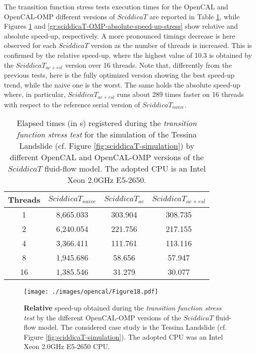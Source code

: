 The transition function stress tests execution times for the
OpenCAL and OpenCAL-OMP different versions of $SciddicaT$ are
reported in Table \ref{tab:sciddicaT-OMP-execution-times-stress},
while Figures \ref{gr:sciddicaT-OMP-relative-speed-up-stress} and
\ref{gr:sciddicaT-OMP-absolute-speed-up-stress} show relative and
absolute speed-up, respectively. A more pronounced timings
decrease is here observed for each $SciddicaT$ version as the
number of threads is increased. This is confirmed by the relative
speed-up, where the highest value of 10.3 is obtained by the
$SciddicaT_{ac+esl}$ version over 16 threads. Note that,
differently from the previous tests, here is the fully optimized
version showing the best speed-up trend, while the naive one is
the worst. The same holds the absolute speed-up where, in
particular, $SciddicaT_{ac+esl}$ runs about 289 times faster on 16
threads with respect to the reference serial version of
$SciddicaT_{naive}$.
\begin{table}
	\centering
	\begin{tabular}{cccc}
		\hline Threads & $SciddicaT_{naive}$ & $SciddicaT_{ac}$ &
		$SciddicaT_{ac+esl}$ \\ \hline 1 & 8,665.033 & 303.904 &
		308.735\\ 2 & 6,240.054 & 221.756 & 217.155\\ 4 & 3,366.411 &
		111.761 & 113.116\\ 8 & 1,945.686 & 58.656 & 57.947\\ 16 &
		1,385.546 & 31.279 & 30.077\\ \hline
	\end{tabular}
	\caption[Elapsed times (in \si{s}) registered during the \emph{transition function stress test} by different OpenCAL and
	OpenCAL-OMP versions of the $SciddicaT$ fluid-flow model.]{Elapsed times (in \si{s}) registered during the \emph{transition function stress test} for the simulation of the Tessina Landslide
		(cf. Figure \ref{fig:sciddicaT-simulation}) by different OpenCAL and
		OpenCAL-OMP versions of the $SciddicaT$ fluid-flow model. The adopted
		CPU is an Intel Xeon 2.0GHz E5-2650.}
	\label{tab:sciddicaT-OMP-execution-times-stress}
\end{table}

\begin{figure}
	\begin{center}
		\texttt{[image: ./images/opencal/Figure18.pdf]}
		\caption[\textbf{Relative} speed-up obtained during the \emph{transition function stress	test} by the different OpenCAL-OMP versions of the $SciddicaT$ fluid-flow model.]{\textbf{Relative} speed-up obtained during the \emph{transition function stress
				test} by the different OpenCAL-OMP versions of the $SciddicaT$
			fluid-flow model. The considered case study is the Tessina Landslide
			(cf. Figure \ref{fig:sciddicaT-simulation}). The adopted CPU was an
			Intel Xeon 2.0GHz E5-2650 CPU.}
		\label{gr:sciddicaT-OMP-relative-speed-up-stress}
	\end{center}
\end{figure}

